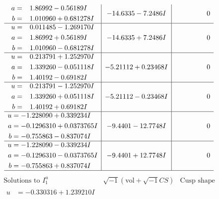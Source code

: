 \documentclass[1p]{elsarticle_modified}
\theoremstyle{definition}
\newcommand{\I}{\sqrt{-1}}
\begin{document}
$$\begin{array}{c|c|c}
\begin{aligned}
a &= \phantom{-}1.86992 - 0.56189 I \\
b &= \phantom{-}1.010960 + 0.681278 I\end{aligned}
 & -14.6335 - 7.2486 I & \phantom{-0.000000 } 0 \\ \hline\begin{aligned}
u &= \phantom{-}0.011485 - 1.269170 I \\
a &= \phantom{-}1.86992 + 0.56189 I \\
b &= \phantom{-}1.010960 - 0.681278 I\end{aligned}
 & -14.6335 + 7.2486 I & \phantom{-0.000000 } 0 \\ \hline\begin{aligned}
u &= \phantom{-}0.213791 + 1.252970 I \\
a &= \phantom{-}1.339260 - 0.051118 I \\
b &= \phantom{-}1.40192 - 0.69182 I\end{aligned}
 & -5.21112 + 0.23468 I & \phantom{-0.000000 } 0 \\ \hline\begin{aligned}
u &= \phantom{-}0.213791 - 1.252970 I \\
a &= \phantom{-}1.339260 + 0.051118 I \\
b &= \phantom{-}1.40192 + 0.69182 I\end{aligned}
 & -5.21112 - 0.23468 I & \phantom{-0.000000 } 0 \\ \hline\begin{aligned}
u &= -1.228090 + 0.339234 I \\
a &= -0.1296310 + 0.0373765 I \\
b &= -0.755863 - 0.837074 I\end{aligned}
 & -9.4401 - 12.7748 I & \phantom{-0.000000 } 0 \\ \hline\begin{aligned}
u &= -1.228090 - 0.339234 I \\
a &= -0.1296310 - 0.0373765 I \\
b &= -0.755863 + 0.837074 I\end{aligned}
 & -9.4401 + 12.7748 I & \phantom{-0.000000 } 0\\
 \hline 
 \end{array}$$\newpage$$\begin{array}{c|c|c}  
\text{Solutions to }I^u_{1}& \I (\text{vol} + \sqrt{-1}CS) & \text{Cusp shape}\\
 \hline 
\begin{aligned}
u &= -0.330316 + 1.239210 I \\

\end{aligned}
\end{array}$$
\end{document}

